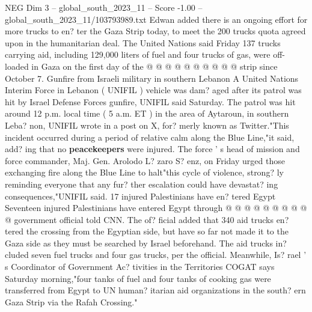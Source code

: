 \begin{textsample}{NEG Dim 3 – global\_south\_2023\_11 – Score -1.00 – global\_south\_2023\_11/103793989.txt}
Edwan added there is an ongoing effort for more trucks to en? ter the Gaza Strip today, to meet the 200 trucks quota agreed upon in the humanitarian deal.
The United Nations said Friday 137 trucks carrying aid, including 129,000 liters of fuel and four trucks of gas, were off-loaded in Gaza on the first day of the @ @ @ @ @ @ @ @ @ @ strip since October 7.
Gunfire from Israeli military in southern Lebanon A United Nations Interim Force in Lebanon ( UNIFIL ) vehicle was dam? aged after its patrol was hit by Israel Defense Forces gunfire, UNIFIL said Saturday.
The patrol was hit around 12 p.m. local time ( 5 a.m.
ET ) in the area of Aytaroun, in southern Leba? non, UNIFIL wrote in a post on X, for? merly known as Twitter."This incident occurred during a period of relative calm along the Blue Line,"it said, add? ing that no \textbf{peacekeepers} were injured.
The force ' s head of mission and force commander, Maj.
Gen.
Arolodo L? zaro S? enz, on Friday urged those exchanging fire along the Blue Line to halt"this cycle of violence, strong? ly reminding everyone that any fur? ther escalation could have devastat? ing consequences,"UNIFIL said. 17 injured Palestinians have en? tered Egypt Seventeen injured Palestinians have entered Egypt through @ @ @ @ @ @ @ @ @ @ government official told CNN.
The of? ficial added that 340 aid trucks en? tered the crossing from the Egyptian side, but have so far not made it to the Gaza side as they must be searched by Israel beforehand.
The aid trucks in? cluded seven fuel trucks and four gas trucks, per the official.
Meanwhile, Is? rael ' s Coordinator of Government Ac? tivities in the Territories COGAT says Saturday morning,"four tanks of fuel and four tanks of cooking gas were transferred from Egypt to UN human? itarian aid organizations in the south? ern Gaza Strip via the Rafah Crossing."

\end{textsample}
